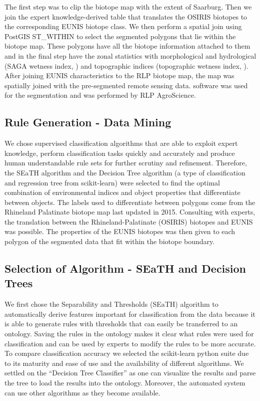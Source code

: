\documentclass[authoryear, review,12pt,number]{elsarticle}
\begin{document}
The first step was to clip the biotope map with the extent of Saarburg.
Then we join the expert knowledge-derived table that translates the OSIRIS
biotopes to the corresponding EUNIS biotope class. We then perform a spatial
join using PostGIS ST\_WITHIN to select the segmented polygons that lie within
the biotope map. These polygons have all the biotope information
attached to them and in the final step have the zonal statistics with
morphological and hydrological (SAGA wetness index, ) and topographic indices 
(topographic wetness index, ). 
After joining EUNIS characteristics to the RLP
biotope map, the map was spatially joined with the pre-segmented remote sensing
data. software was used for the segmentation and was performed by RLP AgroScience. 
\subsection{Rule Generation - Data Mining}
We chose supervised classification algorithms that are able to exploit expert
knowledge, perform classification tasks quickly and accurately and produce human
understandable rule sets for further scrutiny and refinement. Therefore, the
SEaTH algorithm and the Decision Tree algorithm (a type of classification and regression
tree from scikit-learn) were selected to find the optimal combination of 
environmental indices and
object properties that differentiate between objects. The labels used to
differentiate between polygons come from the Rhineland Palatinate biotope map
last updated in 2015. Consulting with experts, the translation between the
Rhineland-Palatinate (OSIRIS) biotopes and EUNIS was possible. The properties of
the EUNIS biotopes was then given to each polygon of the segmented data that
fit within the biotope boundary.
\subsection{Selection of Algorithm - SEaTH and Decision Trees}
We first chose the Separability and Thresholds
(SEaTH) \citep{Nussbaum2006} algorithm to automatically derive features important
for classification from the data because it is able to generate rules with
thresholds that can easily be transferred to an ontology. Saving the rules in
the ontology makes it clear what rules were used for classification and can be
used by experts to modify the rules to be more accurate. To compare
classification accuracy we selected the scikit-learn python suite
\citep{scikit-learn} due to its maturity and ease of use and the availability of
different algorithms. We settled on the ``Decision Tree Classifier'' as one can
visualize the results and parse the tree to load the results into the ontology.
Moreover, the automated system can use other algorithms as they become available.
\end{document}
